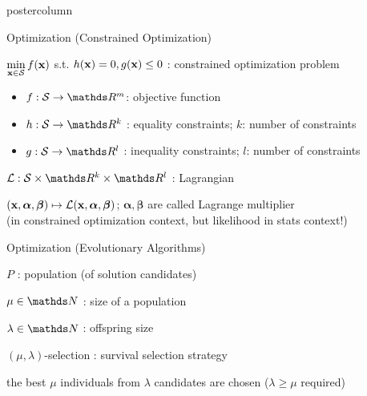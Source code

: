 \documentclass[11pt,compress,t,notes=noshow, xcolor=table]{beamer}
\begin{document}
\begin{frame}[fragile]{}
\begin{columns}
\begin{column}{.31\textwidth}
\begin{beamercolorbox}[center]{postercolumn}
\begin{minipage}{.98\textwidth}
{\begin{myblock}{Optimization (Constrained Optimization)}
					\begin{codebox}
							$\min\limits_{\mathbf{x} \in \mathcal{S}} f(\mathbf{x})$ s.t. $h(\mathbf{x}) = 0, g(\mathbf{x}) \le 0$ : constrained optimization problem
						\end{codebox}
						\begin{itemize}
							\item \quad $f: \mathcal{S} \to \R^m$: objective function
							\item \quad $h: \mathcal{S} \to \R^k$ : equality constraints; $k$: number of constraints\\
							\item \quad $g: \mathcal{S} \to \R^l$ : inequality constraints; $l$: number of constraints
						\end{itemize} \hspace{1ex} 
						\begin{codebox}
							 $\mathcal{L}: \mathcal{S} \times \R^k \times \R^l$ : Lagrangian
						\end{codebox}
						\hspace*{1ex} $(\mathbf{x}, \bm{\alpha}, \bm{\beta}) \mapsto \mathcal{L}(\mathbf{x}, \bm{\alpha}, \bm{\beta})$; $\bm{\alpha}, \bm{\beta}$ are called Lagrange multiplier \\
						\hspace*{1ex} (in constrained optimization context, but likelihood in stats context!)
					\end{myblock}
					\begin{myblock}{Optimization (Evolutionary Algorithms)}
						\begin{codebox}
							 $P$ : population (of solution candidates)
						\end{codebox}
						\hspace*{1ex} 
						\begin{codebox}
							 $\mu \in \N$ : size of a population
						\end{codebox}
						\hspace*{1ex} 
						\begin{codebox}
							 $\lambda \in \N$ : offspring size
						\end{codebox}
						\hspace*{1ex} 
						\begin{codebox}
							 $(\mu, \lambda)$-selection : survival selection strategy
						\end{codebox}
						\hspace*{1ex} the best $\mu$ individuals from $\lambda$ candidates are chosen ($\lambda \ge \mu$ required) \\

\end{myblock}}
\end{minipage}
\end{beamercolorbox}
\end{column}
\end{columns}
\end{frame}
\end{document}
